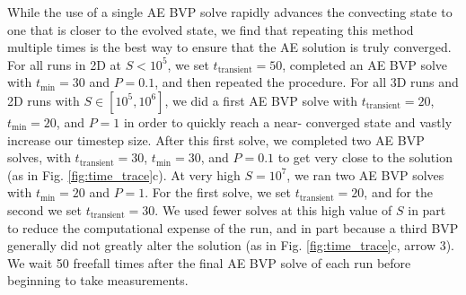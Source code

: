 \documentclass[aps, pre, onecolumn, nofootinbib, notitlepage, groupedaddress, amsfonts, amssymb, amsmath, longbibliography]{revtex4-1}
\begin{document}
While the use of a single AE BVP solve rapidly advances the convecting state to
one that is closer to the evolved state, we find that repeating this method 
multiple times is the best way to
ensure that the AE solution is truly converged. For all runs in 2D at $S < 10^5$, we
set $t_{\text{transient}} = 50$, completed an AE BVP solve
with $t_{\text{min}} = 30$ and $P = 0.1$, and then repeated the procedure.
For all 3D runs and 2D runs with $S \in [10^5, 10^6]$,
we did a first AE BVP solve with $t_{\text{transient}} = 20$,
$t_{\text{min}} = 20$, and $P = 1$ in order to quickly reach a near-
converged state and vastly increase our timestep size.  After this first solve, 
we completed two AE BVP solves, with $t_{\text{transient}} = 30$,
$t_{\text{min}} = 30$, 
and $P = 0.1$ to get very close to the solution (as in Fig. \ref{fig:time_trace}c).
At very high $S = 10^7$, we ran two AE BVP solves with $t_{\text{min}} = 20$ and
$P = 1$. For the first solve, we set $t_{\text{transient}} = 20$, and for the
second we set $t_{\text{transient}} = 30$. We used fewer solves at this high
value of $S$ in part to reduce the computational expense of the run, and in
part because a third BVP generally did not greatly alter the solution
(as in Fig. \ref{fig:time_trace}c, arrow 3). We wait 50 freefall times after
the final AE BVP solve of each run before beginning to take measurements.
\end{document}
